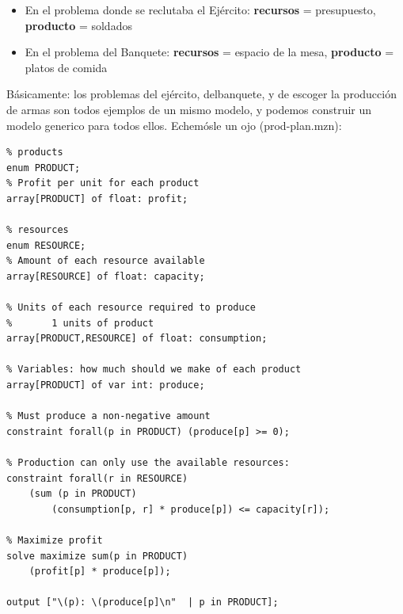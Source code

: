 \documentclass[12pt]{article}
\begin{document}
\begin{itemize}
\item En el problema donde se reclutaba el Ejército: \textbf{recursos} = presupuesto, \textbf{producto} = soldados
\item En el problema del Banquete: \textbf{recursos} = espacio de la mesa, \textbf{producto} = platos de comida
\end{itemize}

\newpage

\begin{justify}
Básicamente: los problemas del ejército, delbanquete, y de escoger la producción de armas son todos ejemplos de un mismo modelo, y podemos construir un modelo generico para todos ellos. Echemósle un ojo (prod-plan.mzn):
\end{justify}

\begin{Verbatim}
% products
enum PRODUCT;
% Profit per unit for each product
array[PRODUCT] of float: profit;

% resources
enum RESOURCE;
% Amount of each resource available
array[RESOURCE] of float: capacity;

% Units of each resource required to produce
%       1 units of product
array[PRODUCT,RESOURCE] of float: consumption;

% Variables: how much should we make of each product
array[PRODUCT] of var int: produce;

% Must produce a non-negative amount
constraint forall(p in PRODUCT) (produce[p] >= 0);

% Production can only use the available resources: 
constraint forall(r in RESOURCE) 
	(sum (p in PRODUCT)
	    (consumption[p, r] * produce[p]) <= capacity[r]);
	    
% Maximize profit
solve maximize sum(p in PRODUCT)
	(profit[p] * produce[p]);

output ["\(p): \(produce[p]\n" 	| p in PRODUCT];
\end{Verbatim}

\newpage
\end{document}
